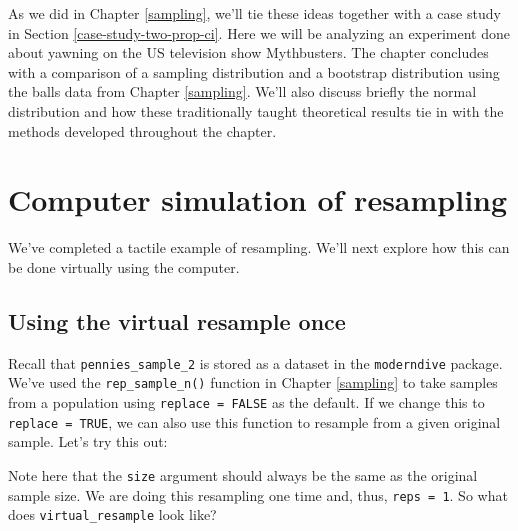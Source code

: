 \documentclass[12pt, krantz2,]{krantz}
\makeatletter
\newenvironment{Shaded}{\begin{snugshade}}{\end{snugshade}}
\newcommand{\DataTypeTok}[1]{\textcolor[rgb]{0.27,0.27,0.27}{#1}}
\newcommand{\DecValTok}[1]{\textcolor[rgb]{0.06,0.06,0.06}{#1}}
\newcommand{\KeywordTok}[1]{\textcolor[rgb]{0.27,0.27,0.27}{\textbf{#1}}}
\newcommand{\NormalTok}[1]{#1}
\newcommand{\OperatorTok}[1]{\textcolor[rgb]{0.43,0.43,0.43}{\textbf{#1}}}
\newcommand{\OtherTok}[1]{\textcolor[rgb]{0.37,0.37,0.37}{#1}}
\newcommand{\StringTok}[1]{\textcolor[rgb]{0.5,0.5,0.5}{#1}}
\newenvironment{kframe}{%
\medskip{}
\setlength{\fboxsep}{.8em}
 \def\at@end@of@kframe{}%
 \ifinner\ifhmode%
  \def\at@end@of@kframe{\end{minipage}}%
  \begin{minipage}{\columnwidth}%
 \fi\fi%
 \def\FrameCommand##1{\hskip\@totalleftmargin \hskip-\fboxsep
 \colorbox{shadecolor}{##1}\hskip-\fboxsep
     \hskip-\linewidth \hskip-\@totalleftmargin \hskip\columnwidth}%
 \MakeFramed {\advance\hsize-\width
   \@totalleftmargin\z@ \linewidth\hsize
   \@setminipage}}%
 {\par\unskip\endMakeFramed%
 \at@end@of@kframe}
\renewenvironment{Shaded}{\begin{kframe}}{\end{kframe}}
\makeatother
\begin{document}
As we did in Chapter \ref{sampling}, we'll tie these ideas together with a case study in Section \ref{case-study-two-prop-ci}. Here we will be analyzing an experiment done about yawning on the US television show Mythbusters. The chapter concludes with a comparison of a sampling distribution and a bootstrap distribution using the balls data from Chapter \ref{sampling}. We'll also discuss briefly the normal distribution and how these traditionally taught theoretical results tie in with the methods developed throughout the chapter.

\hypertarget{resampling-simulation}{%
\section{Computer simulation of resampling}\label{resampling-simulation}}

We've completed a tactile example of resampling. We'll next explore how this can be done virtually using the computer.

\hypertarget{using-the-virtual-resample-once}{%
\subsection{Using the virtual resample once}\label{using-the-virtual-resample-once}}

Recall that \texttt{pennies\_sample\_2} is stored as a dataset in the \texttt{moderndive} package. We've used the \texttt{rep\_sample\_n()} function in Chapter \ref{sampling} to take samples from a population using \texttt{replace\ =\ FALSE} as the default. If we change this to \texttt{replace\ =\ TRUE}, we can also use this function to resample from a given original sample. Let's try this out:

\begin{Shaded}
\end{Shaded}

Note here that the \texttt{size} argument should always be the same as the original sample size. We are doing this resampling one time and, thus, \texttt{reps\ =\ 1}. So what does \texttt{virtual\_resample} look like?
\end{document}

